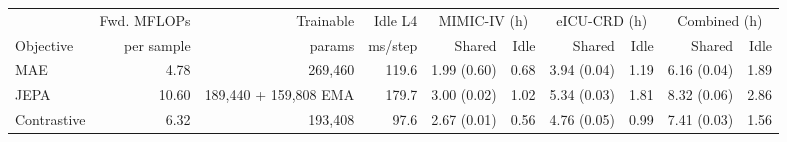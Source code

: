 \setlength{\tabcolsep}{4pt}
\begin{tabular}{@{}lrrrrrrrrr@{}}
\toprule
 & Fwd. MFLOPs & Trainable & Idle L4 & \multicolumn{2}{c}{MIMIC-IV (h)} & \multicolumn{2}{c}{eICU-CRD (h)} & \multicolumn{2}{c}{Combined (h)} \\
\cmidrule(lr){5-6} \cmidrule(lr){7-8} \cmidrule(lr){9-10}
Objective & per sample & params & ms/step & Shared & Idle & Shared & Idle & Shared & Idle \\
\midrule
MAE & 4.78 & 269,460 & 119.6 & 1.99 (0.60) & 0.68 & 3.94 (0.04) & 1.19 & 6.16 (0.04) & 1.89 \\
JEPA & 10.60 & 189,440 + 159,808 EMA & 179.7 & 3.00 (0.02) & 1.02 & 5.34 (0.03) & 1.81 & 8.32 (0.06) & 2.86 \\
Contrastive & 6.32 & 193,408 & 97.6 & 2.67 (0.01) & 0.56 & 4.76 (0.05) & 0.99 & 7.41 (0.03) & 1.56 \\
\bottomrule
\end{tabular}

